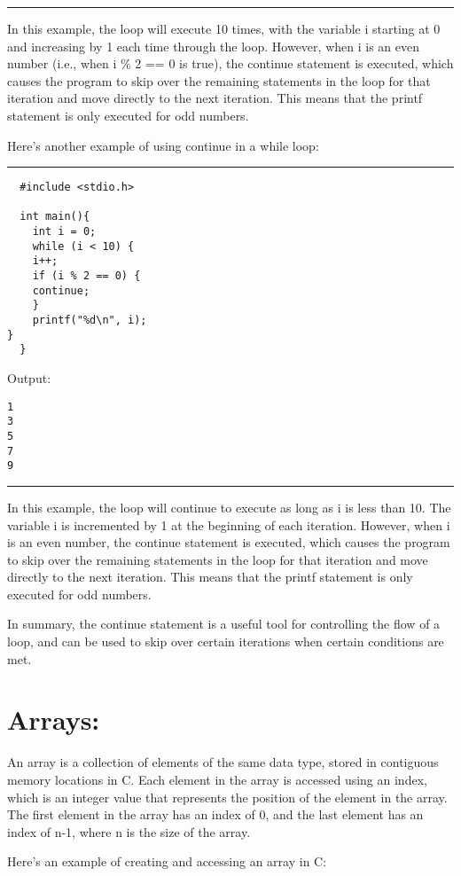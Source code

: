 \documentclass[a4paper]{article}
\begin{document}
\noindent\rule{\textwidth}{0.5pt}
In this example, the loop will execute 10 times, with the variable i starting at
0 and increasing by 1 each time through the loop. However, when i is an even
number (i.e., when i \% 2 == 0 is true), the continue statement is executed,
which causes the program to skip over the remaining statements in the loop for
that iteration and move directly to the next iteration. This means that the
printf statement is only executed for odd numbers.


Here's another example of using continue in a while loop:

\noindent\rule{\textwidth}{0.5pt}
\begin{verbatim}
  #include <stdio.h>

  int main(){
    int i = 0;
    while (i < 10) {
    i++;
    if (i % 2 == 0) {
	continue;
    }
    printf("%d\n", i);
}
  }
\end{verbatim}
Output:
\begin{verbatim}
1
3
5
7
9
\end{verbatim}

\noindent\rule{\textwidth}{0.5pt}
In this example, the loop will continue to execute as long as i is less
than 10. The variable i is incremented by 1 at the beginning of each
iteration. However, when i is an even number, the continue statement is
executed, which causes the program to skip over the remaining statements in the
loop for that iteration and move directly to the next iteration. This means that
the printf statement is only executed for odd numbers.


In summary, the continue statement is a useful tool for controlling the flow of
a loop, and can be used to skip over certain iterations when certain conditions
are met.

\section{Arrays:}
\label{sec:orgb6701d0}
An array is a collection of elements of the same data type, stored in contiguous
memory locations in C. Each element in the array is accessed using an index,
which is an integer value that represents the position of the element in the
array. The first element in the array has an index of 0, and the last element
has an index of n-1, where n is the size of the array.


Here's an example of creating and accessing an array in C:
\end{document}
